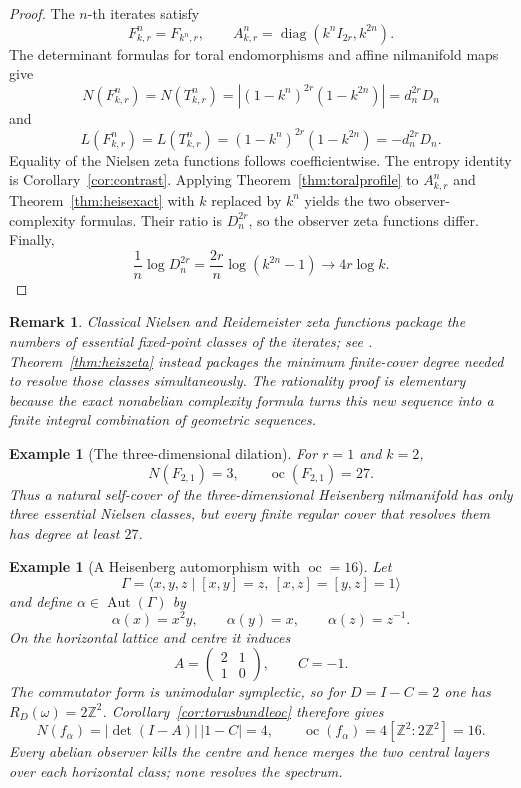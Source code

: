 \documentclass[11pt]{article}
\newtheorem{remark}[theorem]{Remark}
\newtheorem{example}[theorem]{Example}
\DeclareMathOperator{\Aut}{Aut}
\DeclareMathOperator{\oc}{oc}
\newcommand{\Z}{\mathbb Z}
\begin{document}
\begin{proof}
The $n$-th iterates satisfy
\[
  F_{k,r}^n=F_{k^n,r},
  \qquad
  A_{k,r}^n=\operatorname{diag}(k^nI_{2r},k^{2n}).
\]
The determinant formulas for toral endomorphisms and affine nilmanifold maps
give
\[
  N(F_{k,r}^n)=N(T_{k,r}^n)
  =\left|(1-k^n)^{2r}(1-k^{2n})\right|
  =d_n^{2r}D_n
\]
and
\[
  L(F_{k,r}^n)=L(T_{k,r}^n)
  =(1-k^n)^{2r}(1-k^{2n})
  =-d_n^{2r}D_n.
\]
Equality of the Nielsen zeta functions follows coefficientwise.  The entropy
identity is Corollary~\ref{cor:contrast}.  Applying
Theorem~\ref{thm:toralprofile} to $A_{k,r}^n$ and
Theorem~\ref{thm:heisexact} with $k$ replaced by $k^n$ yields the two
observer-complexity formulas.  Their ratio is $D_n^{2r}$, so the observer zeta
functions differ.  Finally,
\[
  \frac1n\log D_n^{2r}
  =\frac{2r}{n}\log(k^{2n}-1)
  \longrightarrow 4r\log k.
\]
\end{proof}

\begin{remark}
Classical Nielsen and Reidemeister zeta functions package the numbers of
essential fixed-point classes of the iterates; see
\cite{FelHill,DekimpeDugardein,FelLee}.  Theorem~\ref{thm:heiszeta} instead packages the minimum finite-cover degree needed to
resolve those classes simultaneously.  The rationality proof is elementary
because the exact nonabelian complexity formula turns this new sequence into
a finite integral combination of geometric sequences.
\end{remark}

\begin{example}[The three-dimensional dilation]
For $r=1$ and $k=2$,
\[
  N(F_{2,1})=3,
  \qquad
  \oc(F_{2,1})=27.
\]
Thus a natural self-cover of the three-dimensional Heisenberg nilmanifold has
only three essential Nielsen classes, but every finite regular cover that
resolves them has degree at least $27$.
\end{example}

\begin{example}[A Heisenberg automorphism with $\oc=16$]
Let
\[
  \Gamma=\langle x,y,z\mid[x,y]=z,\ [x,z]=[y,z]=1\rangle
\]
and define $\alpha\in\Aut(\Gamma)$ by
\[
  \alpha(x)=x^2y,\qquad \alpha(y)=x,\qquad \alpha(z)=z^{-1}.
\]
On the horizontal lattice and centre it induces
\[
  A=\begin{pmatrix}2&1\\1&0\end{pmatrix},\qquad C=-1.
\]
The commutator form is unimodular symplectic, so for $D=I-C=2$ one has
$R_D(\omega)=2\Z^2$.  Corollary~\ref{cor:torusbundleoc} therefore gives
\[
  N(f_\alpha)=|\det(I-A)|\,|1-C|=4,
  \qquad
  \oc(f_\alpha)=4[\Z^2:2\Z^2]=16.
\]
Every abelian observer kills the centre and hence merges the two central
layers over each horizontal class; none resolves the spectrum.
\end{example}
\end{document}
